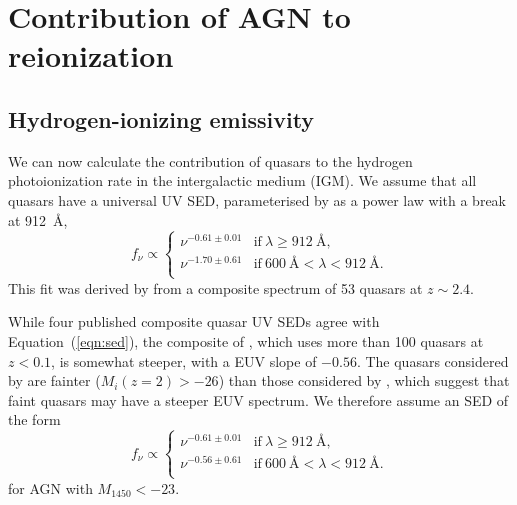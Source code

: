 \documentclass[a4paper,fleqn,usenatbib]{mnras}
\begin{document}
\section{Contribution of AGN to reionization}

\subsection{Hydrogen-ionizing emissivity}

We can now calculate the contribution of quasars to the hydrogen
photoionization rate in the intergalactic medium (IGM).  We assume
that all quasars have a universal UV SED, parameterised by
\citet{2015MNRAS.449.4204L} as a power law with a break at 912~{\AA},
\begin{equation}
f_\nu\propto\begin{cases}
               \nu^{-0.61\pm 0.01} & \text{if}~\lambda\geq 912~\text{\AA},\\
               \nu^{-1.70\pm 0.61} & \text{if}~600~\text{\AA}<\lambda<912~\text{\AA}.\\                
               \end{cases}
\label{eqn:sed}
\end{equation}
This fit was derived by \citet{2015MNRAS.449.4204L} from a composite
spectrum of 53 quasars at $z\sim 2.4$.

While four published composite quasar UV SEDs
\citep{2002ApJ...565..773T, 2001AJ....122..549V, 2012ApJ...752..162S,
  2014ApJ...794...75S} agree with Equation~(\ref{eqn:sed}), the
composite of \citet{2004ApJ...615..135S}, which uses more than 100
quasars at $z<0.1$, is somewhat steeper, with a EUV slope of $-0.56$.
The quasars considered by \citet{2004ApJ...615..135S} are fainter
($M_i(z=2)>-26$) than those considered by \citet{2015MNRAS.449.4204L},
which suggest that faint quasars may have a steeper EUV spectrum.  We
therefore assume an SED of the form
\begin{equation}
f_\nu\propto\begin{cases}
               \nu^{-0.61\pm 0.01} & \text{if}~\lambda\geq 912~\text{\AA},\\
               \nu^{-0.56\pm 0.61} & \text{if}~600~\text{\AA}<\lambda<912~\text{\AA}.\\                
               \end{cases}
\label{eqn:sed_faint}
\end{equation}
for AGN with $M_{1450}<-23$.
\end{document}
